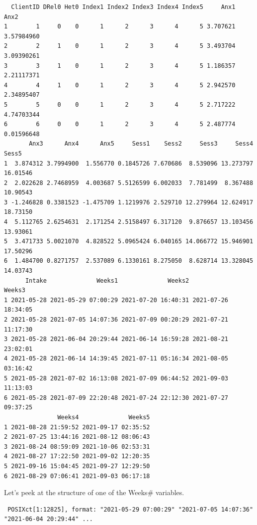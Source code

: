 \documentclass[
  english,
]{book}
\newenvironment{Shaded}{\begin{snugshade}}{\end{snugshade}}
\newcommand{\FunctionTok}[1]{\textcolor[rgb]{0.00,0.00,0.00}{#1}}
\newcommand{\NormalTok}[1]{#1}
\newcommand{\SpecialCharTok}[1]{\textcolor[rgb]{0.00,0.00,0.00}{#1}}
\begin{document}
\begin{verbatim}
  ClientID DRel0 Het0 Index1 Index2 Index3 Index4 Index5     Anx1       Anx2
1        1     0    0      1      2      3      4      5 3.707621 3.57984960
2        2     1    0      1      2      3      4      5 3.493704 3.09390261
3        3     1    0      1      2      3      4      5 1.186357 2.21117371
4        4     1    0      1      2      3      4      5 2.942570 2.34895407
5        5     0    0      1      2      3      4      5 2.717222 4.74703344
6        6     0    0      1      2      3      4      5 2.487774 0.01596648
       Anx3      Anx4      Anx5     Sess1    Sess2     Sess3     Sess4    Sess5
1  3.874312 3.7994900  1.556770 0.1845726 7.670686  8.539096 13.273797 16.01546
2  2.022628 2.7468959  4.003687 5.5126599 6.002033  7.781499  8.367488 10.90543
3 -1.246828 0.3381523 -1.475709 1.1219976 2.529710 12.279964 12.624917 18.73150
4  5.112765 2.6254631  2.171254 2.5158497 6.317120  9.876657 13.103456 13.93061
5  3.471733 5.0021070  4.828522 5.0965424 6.040165 14.066772 15.946901 17.50296
6  1.484700 0.8271757  2.537089 6.1330161 8.275050  8.628714 13.328045 14.03743
      Intake              Weeks1              Weeks2              Weeks3
1 2021-05-28 2021-05-29 07:00:29 2021-07-20 16:40:31 2021-07-26 18:34:05
2 2021-05-28 2021-07-05 14:07:36 2021-07-09 00:20:29 2021-07-21 11:17:30
3 2021-05-28 2021-06-04 20:29:44 2021-06-14 16:59:28 2021-08-21 23:02:01
4 2021-05-28 2021-06-14 14:39:45 2021-07-11 05:16:34 2021-08-05 03:16:42
5 2021-05-28 2021-07-02 16:13:08 2021-07-09 06:44:52 2021-09-03 11:13:03
6 2021-05-28 2021-07-09 22:20:48 2021-07-24 22:12:30 2021-07-27 09:37:25
               Weeks4              Weeks5
1 2021-08-28 21:59:52 2021-09-17 02:35:52
2 2021-07-25 13:44:16 2021-08-12 08:06:43
3 2021-08-24 08:59:09 2021-10-06 02:53:31
4 2021-08-27 17:22:50 2021-09-02 12:20:35
5 2021-09-16 15:04:45 2021-09-27 12:29:50
6 2021-08-29 07:06:41 2021-09-03 06:17:18
\end{verbatim}

Let's peek at the structure of one of the Weeks\# variables.

\begin{Shaded}
\end{Shaded}

\begin{verbatim}
 POSIXct[1:12825], format: "2021-05-29 07:00:29" "2021-07-05 14:07:36" "2021-06-04 20:29:44" ...
\end{verbatim}
\end{document}
